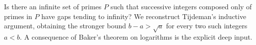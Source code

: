 Is there an infinite set of primes $P$ such that successive
integers composed only of primes in $P$ have gaps tending to
infinity? We reconstruct Tijdeman's inductive argument, obtaining
the stronger bound $b-a>\sqrt a$ for every two such integers
$a<b$. A consequence of Baker's theorem on logarithms is the
explicit deep input.

